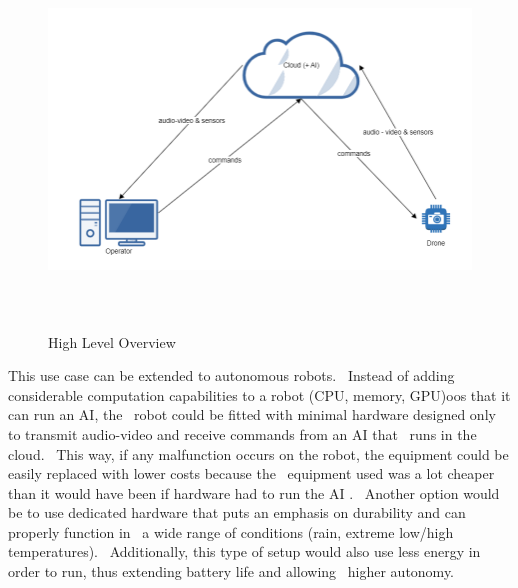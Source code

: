 \begin{figure}[ht]
    \label{fig:overview1}
    \includegraphics[width=15cm, height=10cm, keepaspectratio]{img/overview1.PNG}
    \caption{High Level Overview}
\end{figure}

This use case can be extended to autonomous robots. \
Instead of adding considerable computation capabilities to a robot (CPU, memory, GPU)oos that it can run an AI, the \
robot could be fitted with minimal hardware designed only to transmit audio-video and receive commands from an AI that \
runs in the cloud. \
This way, if any malfunction occurs on the robot, the equipment could be easily replaced with lower costs because the \
equipment used was a lot cheaper than it would have been if hardware had to run the AI . \
Another option would be to use dedicated hardware that puts an emphasis on durability and can properly function in \
a wide range of conditions (rain, extreme low/high temperatures). \
Additionally, this type of setup would also use less energy in order to run, thus extending battery life and allowing \
higher autonomy.


